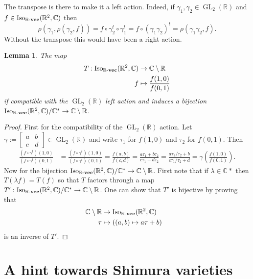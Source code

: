 \documentclass[a4paper,12pt,reqno]{amsart}
\newcommand{\field}[1]{\mathbb{#1}}  %
\newcommand{\R}{\field{R}} %
\newcommand{\C}{\field{C}} %
\newcommand{\IsoKVec}[1]{\mathrm{Iso}_{#1 {\bf\text{-}vec}}}
\newcommand{\transpose}{t}
\DeclareMathOperator{\GL}{GL}
\newtheorem{lemma}{Lemma}
\theoremstyle{definition}
\numberwithin{lemma}{section}
\numberwithin{equation}{section}
\numberwithin{figure}{section}
\begin{document}
The transpose is there to make it a left action.  Indeed, if $\gamma_1,\gamma_2 \in \GL_2(\R)$ and $f \in  \IsoKVec{\R}(\R^2,\C)$ then $$\rho(\gamma_1,\rho(\gamma_2,f))=f \circ \gamma_2^\transpose \circ \gamma_1^\transpose = f \circ (\gamma_1 \gamma_2)^\transpose = \rho(\gamma_1\gamma_2,f).$$ Without the transpose this would have been a right action. 

\begin{lemma}
The map 
\begin{align}T  :\IsoKVec{\R}(\R^2,\C) &\to \C \setminus \R\\
                             f &\mapsto \frac {f(1,0)}{f(0,1)}
\end{align}
if compatible with the $\GL_2(\R)$ left action and induces a bijection $\IsoKVec{\R}(\R^2,\C)/\C^* \to \C \setminus \R$.
\end{lemma}

\begin{proof}
First for the compatibility of the $\GL_2(\R)$ action. Let $\gamma := \left [\begin{smallmatrix}
a & b \\ 
c & d
\end{smallmatrix}\right] \in \GL_2(\R)$ and write $\tau_1$ for $f(1,0)$ and $\tau_2$ for $f(0,1)$. Then
\begin{align*}
\frac {(f \circ \gamma^\transpose) (1,0)} {(f \circ \gamma^\transpose) (0,1)} &= \frac {(f \circ \gamma^\transpose) (1,0)} {(f \circ \gamma^\transpose) (0,1)}  =\frac {f(a,b)} {f(c,d)}  = \frac{a\tau_1+b\tau_2}{c\tau_1 + d\tau_2} =  \frac{a\tau_1/\tau_2+b}{c\tau_1/\tau_2 + d} = \gamma\left(\frac {f (1,0)} {f (0,1)}\right).
\end{align*}
Now for the bijection $\IsoKVec{\R}(\R^2,\C)/\C^* \to \C \setminus \R$. First note that if $\lambda \in \C*$ then $T(\lambda f) = T(f)$ so that $T$ factors through a map $T' : \IsoKVec{\R}(\R^2,\C)/\C^*  \to \C \setminus \R$. One can show that $T'$ is bijective by proving that 
\begin{align*}\C \setminus \R &\to \IsoKVec{\R}(\R^2,\C) & \\
\tau &\mapsto ((a,b) \mapsto a\tau +b)
\end{align*}
is an inverse of $T'$.
\end{proof}



\section{A hint towards Shimura varieties}
\end{document}
